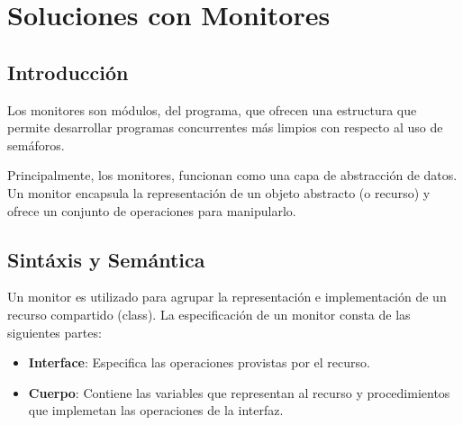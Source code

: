 \documentclass[a4paper, 10pt]{report}
\begin{document}
\chapter{Soluciones con Monitores}

\section{Introducción}

Los monitores son módulos, del programa, que ofrecen una estructura que permite desarrollar programas concurrentes más limpios con respecto al uso de semáforos.

Principalmente, los monitores, funcionan como una capa de abstracción de datos. Un monitor encapsula la representación de un objeto abstracto (o recurso) y ofrece un conjunto de operaciones para manipularlo.




\section{Sintáxis y Semántica}

Un monitor es utilizado para agrupar la representación e implementación de un recurso compartido (class). La especificación de un monitor consta de las siguientes partes:

\begin{itemize}
    \item \textbf{Interface}: Especifica las operaciones provistas por el recurso.
    \item \textbf{Cuerpo}: Contiene las variables que representan al recurso y procedimientos que implemetan las operaciones de la interfaz.
\end{itemize}
\end{document}
